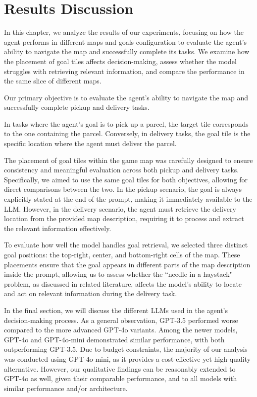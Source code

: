 \chapter{Results Discussion}
\label{cha:results_discussion}

In this chapter, we analyze the results of our experiments, focusing on how the
agent performs in different maps and goals configuration to evaluate the agent's
ability to navigate the map and successfully complete its tasks. We examine how the
placement of goal tiles affects decision-making, assess whether the model
struggles with retrieving relevant information, and compare the performance in the
same slice of different maps.

Our primary objective is to evaluate the agent's ability to navigate the map and
successfully complete pickup and delivery tasks.

In tasks where the agent's goal is to pick up a parcel, the target tile
corresponds to the one containing the parcel. Conversely, in delivery tasks, the
goal tile is the specific location where the agent must deliver the parcel.

The placement of goal tiles within the game map was carefully designed to ensure
consistency and meaningful evaluation across both pickup and delivery tasks.
Specifically, we aimed to use the same goal tiles for both objectives, allowing
for direct comparisons between the two. In the pickup scenario, the goal is
always explicitly stated at the end of the prompt, making it immediately available
to the LLM. However, in the delivery scenario, the agent must retrieve the
delivery location from the provided map description, requiring it to process and
extract the relevant information effectively.

To evaluate how well the model handles goal retrieval, we selected three
distinct goal positions: the top-right, center, and bottom-right cells of the map.
These placements ensure that the goal appears in different parts of the map
description inside the prompt, allowing us to assess whether the ``needle in a haystack"
problem, as discussed in related literature, affects the model's ability to
locate and act on relevant information during the delivery task.

In the final section, we will discuss the different LLMs used in the agent's decision-making
process. As a general observation, GPT-3.5 performed worse compared to the more advanced
GPT-4o variants. Among the newer models, GPT-4o and GPT-4o-mini demonstrated similar
performance, with both outperforming GPT-3.5. Due to budget constraints, the
majority of our analysis was conducted using GPT-4o-mini, as it provides a cost-effective
yet high-quality alternative. However, our qualitative findings can be reasonably
extended to GPT-4o as well, given their comparable performance, and to all models
with similar performance and/or architecture.

